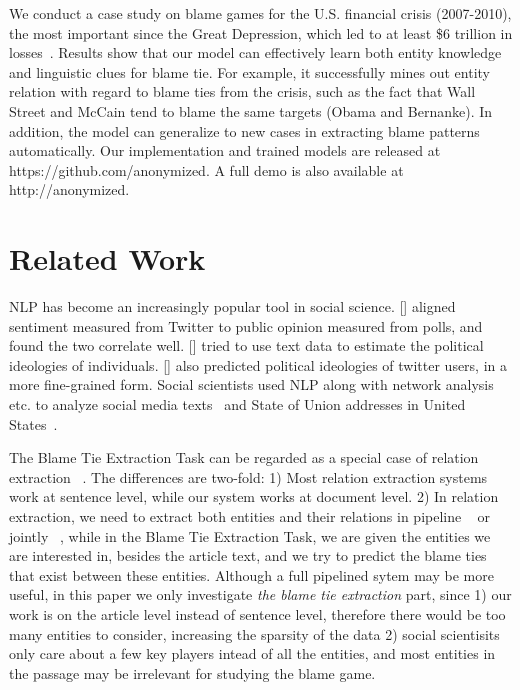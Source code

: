 \documentclass[letterpaper]{article}
\begin{document}
We conduct a case study on blame games for the U.S. financial crisis (2007-2010), the most important since the Great Depression, which led to at least \$6 trillion in losses~\cite{luttrell2013assessing}. Results show that our model can effectively learn both entity knowledge and linguistic clues for blame tie. For example, it successfully mines out entity relation with regard to blame ties from the crisis, such as the fact that Wall Street and McCain tend to blame the same targets (Obama and Bernanke). In addition, the model can generalize to new cases in extracting blame patterns automatically. Our implementation and trained models are released at https://github.com/anonymized. A full demo is also available at http://anonymized.

\section{Related Work}
\label{task}

NLP has become an increasingly popular tool in social science. \citeauthor{o2010tweets} [\citeyear{o2010tweets}] aligned sentiment measured from Twitter to public opinion measured from polls, and found the two correlate well. \citeauthor{bamman2015open} [\citeyear{bamman2015open}] tried to use text data to estimate the political ideologies of individuals. \citeauthor{preoctiuc2017beyond} [\citeyear{preoctiuc2017beyond}] also predicted political ideologies of twitter users, in a more fine-grained form. Social scientists used NLP along with network analysis etc. to analyze social media texts~\cite{rule2015lexical} and State of Union addresses in United States~\cite{bail2016combining}.

The Blame Tie Extraction Task can be regarded as a special case of relation extraction ~\cite{miwa2016end}. The differences are two-fold: 1) Most relation extraction systems work at sentence level, while our system works at document level. 2) In relation extraction, we need to extract both entities and their relations in pipeline ~\cite{nadeau2007survey,rink2010utd} or jointly ~\cite{zheng2017joint}, while in the Blame Tie Extraction Task, we are given the entities we are interested in, besides the article text, and we try to predict the blame ties that exist between these entities. Although a full pipelined sytem may be more useful, in this paper we only investigate {\it the blame tie extraction} part, since 1) our work is on the article level instead of sentence level, therefore there would be too many entities to consider, increasing the sparsity of the data 2) social scientisits only care about a few key players intead of all the entities, and most entities in the passage may be irrelevant for studying the blame game.
\end{document}
